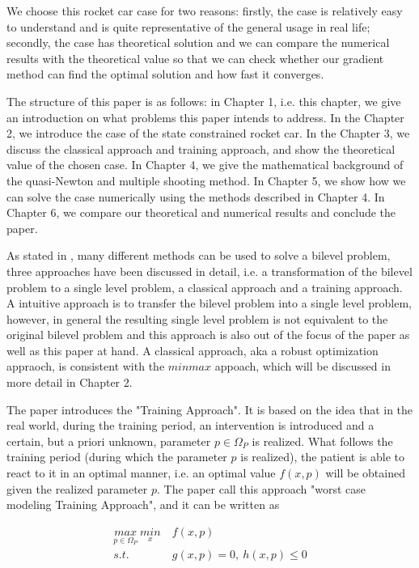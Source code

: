 	We choose this rocket car case for two reasons: firstly, the case is relatively easy to understand and is quite representative of the general usage in real life; secondly, the case has theoretical solution and we can compare the numerical results with the theoretical value so that we can check whether our gradient method can find the optimal solution and how fast it converges. 
	
	The structure of this paper is as follows: in Chapter 1, i.e. this chapter,  we give an introduction on what problems this paper intends to address. In the Chapter 2, we introduce the case of the state constrained rocket car. In the Chapter 3, we discuss the classical approach and training approach, and show the theoretical value of the chosen case. In Chapter 4, we give the mathematical background of the quasi-Newton and multiple shooting method. In Chapter 5, we show how we can solve the case numerically using the methods described in Chapter 4. In Chapter 6, we compare our theoretical and numerical results and conclude the paper. 
	
	
	
	As stated in \cite{MatSch22}, many different methods can be used to solve a bilevel problem, three approaches have been discussed in detail, i.e. a transformation of the bilevel problem to a single level problem, a classical approach and a training approach. A intuitive approach is to transfer the bilevel problem into a single level problem, however, in general the resulting single level problem is not equivalent to the original bilevel problem and this approach is also out of the focus of the paper \cite{MatSch22} as well as this paper at hand. A classical approach, aka a robust optimization appraoch, is consistent with the $minmax$ appoach, which will be discussed in more detail in Chapter 2.
	
	The paper \cite{MatSch22} introduces the "Training Approach".  It is based on the idea that in the real world, during the training period, an intervention is introduced and a certain, but a priori unknown, parameter $p \in \Omega_P$ is realized. What follows the training period (during which the parameter $p$ is realized), the patient is able to react to it in an optimal manner, i.e. an optimal value $f(x,p)$ will be obtained given the  realized parameter $p$. The paper \cite{MatSch22} call this approach "worst case modeling Training Approach", and it can be written as 
	
	\begin{equation}
		\begin{aligned}
			\underset{p \in \Omega_P}{max} \ \underset{x}{min} & \  f(x,p) \\ 
			s.t.  & \  g(x, p) = 0, \  h(x,p)  \leq  0 \\
		\end{aligned}
		\label{maxmin}
	\end{equation}
	
